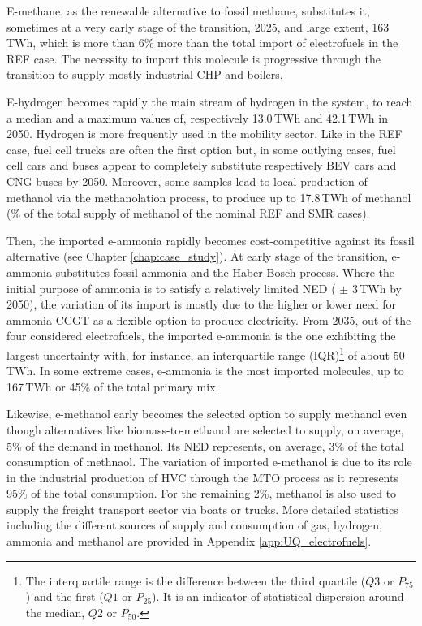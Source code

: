 E-methane, as the renewable alternative to fossil methane, substitutes it, sometimes at a very early stage of the transition, 2025, and large extent, 163\,TWh, which is more than 6\% more than the total import of electrofuels in the REF case. The necessity to import this molecule is progressive through the transition to supply mostly industrial \gls{CHP} and boilers. 

E-hydrogen becomes rapidly the main stream of hydrogen in the system, to reach a median and a maximum values of, respectively 13.0\,TWh and 42.1\,TWh in 2050. Hydrogen is more frequently used in the mobility sector. Like in the REF case, fuel cell trucks are often the first option but, in some outlying cases, fuel cell cars and buses appear to completely substitute respectively \gls{BEV} cars and \gls{CNG} buses by 2050. Moreover, some samples lead to local production of methanol via the methanolation process, to produce up to 17.8\,TWh of methanol (\% of the total supply of methanol of the nominal REF and SMR cases). 

Then, the imported e-ammonia rapidly becomes cost-competitive against its fossil alternative (see Chapter \ref{chap:case_study}). At early stage of the transition, e-ammonia substitutes fossil ammonia and the Haber-Bosch process. Where the initial purpose of ammonia is to satisfy a relatively limited \acrfull{NED} ( $\pm$ 3\,TWh by 2050), the variation of its import is mostly due to the higher or lower need for ammonia-\gls{CCGT} as a flexible option to produce electricity. From 2035, out of the four considered electrofuels, the imported e-ammonia is the one exhibiting the largest uncertainty with, for instance, an interquartile range (IQR)\footnote{The interquartile range is the difference between the third quartile ($Q3$ or $P_{75}$) and the first ($Q1$ or $P_{25}$). It is an indicator of statistical dispersion around the median, $Q2$ or $P_{50}$.} of about 50\,TWh. In some extreme cases, e-ammonia is the most imported molecules, \ie up to 167\,TWh or 45\% of the total primary mix. 

Likewise, e-methanol early becomes the selected option to supply methanol even though alternatives like biomass-to-methanol are selected to supply, on average, 5\% of the demand in methanol. Its \gls{NED} represents, on average, 3\% of the total consumption of methnaol. The variation of imported e-methanol is due to its role in the industrial production of \gls{HVC} through the \acrfull{MTO} process as it represents 95\% of the total consumption. For the remaining 2\%, methanol is also used to supply the freight transport sector via boats or trucks. More detailed statistics including the different sources of supply and consumption of gas, hydrogen, ammonia and methanol are provided in Appendix \ref{app:UQ_electrofuels}.\\

